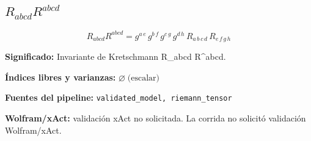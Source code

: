 \documentclass[11pt]{article}
\begin{document}
\subsection*{$ R_{abcd}R^{abcd} $}
\begin{dmath*}[breakdepth={5}]
R_{abcd}R^{abcd} = g{}^{a\,e}\,g{}^{b\,f}\,g{}^{c\,g}\,g{}^{d\,h}\,R{}_{a\,b\,c\,d}\,R{}_{e\,f\,g\,h}
\end{dmath*}
\par\vspace{1.2\baselineskip}\noindent
\begin{minipage}{\linewidth}
\textbf{Significado:} Invariante de Kretschmann R\_abcd R^abcd.\par
\textbf{Índices libres y varianzas:} $ \varnothing\;\text{(escalar)} $\par
\textbf{Fuentes del pipeline:} \texttt{validated\_model, riemann\_tensor}\par
\textbf{Wolfram/xAct:} validación xAct no solicitada. La corrida no solicitó validación Wolfram/xAct.\par
\end{minipage}
\end{document}
